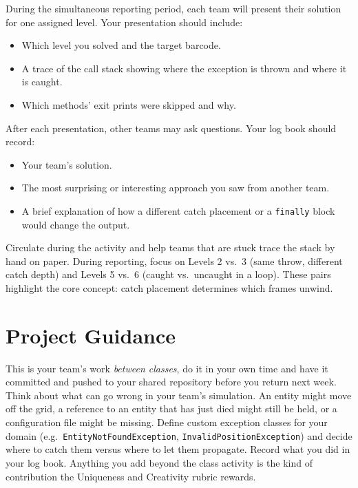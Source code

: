 \documentclass[twoside=false,DIV=14]{scrartcl}
\begin{document}
During the simultaneous reporting period, each team will present their solution for one assigned level.  Your presentation should include:

\begin{itemize}
\itemsep0em
\item Which level you solved and the target barcode.
\item A trace of the call stack showing where the exception is thrown and where it is caught.
\item Which methods' exit prints were skipped and why.
\end{itemize}

After each presentation, other teams may ask questions.  Your log book should record:
\begin{itemize}
\itemsep0em
\item Your team's solution.
\item The most surprising or interesting approach you saw from another team.
\item A brief explanation of how a different catch placement or a \texttt{finally} block would change the output.
\end{itemize}

\begin{teacher}
Circulate during the activity and help teams that are stuck trace the stack by hand on paper.  During reporting, focus on Levels 2 vs.\ 3 (same throw, different catch depth) and Levels 5 vs.\ 6 (caught vs.\ uncaught in a loop).  These pairs highlight the core concept: catch placement determines which frames unwind.
\end{teacher}

\section*{Project Guidance}

This is your team's work \emph{between classes}, do it in your own time and have it committed and pushed to your shared repository before you return next week.  Think about what can go wrong in your team's simulation.  An entity might move off the grid, a reference to an entity that has just died might still be held, or a configuration file might be missing.  Define custom exception classes for your domain (e.g.\ \texttt{EntityNotFoundException}, \texttt{InvalidPositionException}) and decide where to catch them versus where to let them propagate.  Record what you did in your log book.  Anything you add beyond the class activity is the kind of contribution the Uniqueness and Creativity rubric rewards.
\end{document}
